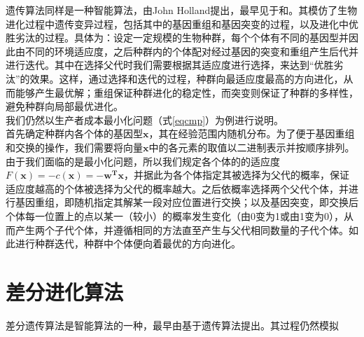 \documentclass[11pt,a4paper]{article}
\begin{document}
遗传算法同样是一种智能算法，由John Holland提出，最早见于\textcite{RN5873}和\textcite{RN5874}。其模仿了生物进化过程中遗传变异过程，包括其中的基因重组和基因突变的过程，以及进化中优胜劣汰的过程。具体为：设定一定规模的生物种群，每个个体有不同的基因型并因此由不同的环境适应度，之后种群内的个体配对经过基因的突变和重组产生后代并进行迭代。其中在选择父代时我们需要根据其适应度进行选择，来达到“优胜劣汰”的效果。这样，通过选择和迭代的过程，种群向最适应度最高的方向进化，从而能够产生最优解；重组保证种群进化的稳定性，而突变则保证了种群的多样性，避免种群向局部最优进化。\\
我们仍然以生产者成本最小化问题（式\ref{eqcmp}）为例进行说明。\\
首先确定种群内各个体的基因型$\mathbf{x}$，其在经验范围内随机分布。为了便于基因重组和交换的操作，我们需要将向量$\mathbf{x}$中的各元素的取值以二进制表示并按顺序排列。由于我们面临的是最小化问题，所以我们规定各个体的的适应度$F(\mathbf{x})=-c(\mathbf{x})=-\mathbf{w^T x}$，并据此为各个体指定其被选择为父代的概率，保证适应度越高的个体被选择为父代的概率越大。之后依概率选择两个父代个体，并进行基因重组，即随机指定其解某一段对应位置进行交换；以及基因突变，即交换后个体每一位置上的点以某一（较小）的概率发生变化（由0变为1或由1变为0），从而产生两个子代个体，并遵循相同的方法直至产生与父代相同数量的子代个体。如此进行种群迭代，种群中个体便向着最优的方向进化。

\section{差分进化算法}
差分遗传算法是智能算法的一种，最早由\textcite{RN5878}基于遗传算法提出。其过程仍然模拟









\newpage
\printbibliography[title=参考文献]
\end{document}
